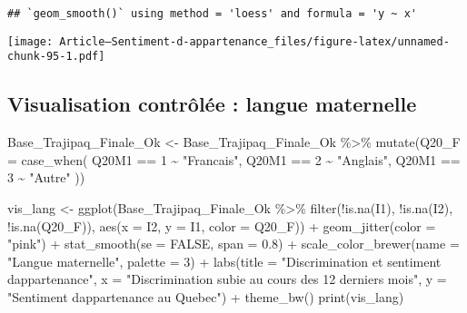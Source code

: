 \documentclass[
]{article}
\newenvironment{Shaded}{\begin{snugshade}}{\end{snugshade}}
\newcommand{\AttributeTok}[1]{\textcolor[rgb]{0.77,0.63,0.00}{#1}}
\newcommand{\ConstantTok}[1]{\textcolor[rgb]{0.00,0.00,0.00}{#1}}
\newcommand{\DecValTok}[1]{\textcolor[rgb]{0.00,0.00,0.81}{#1}}
\newcommand{\FloatTok}[1]{\textcolor[rgb]{0.00,0.00,0.81}{#1}}
\newcommand{\FunctionTok}[1]{\textcolor[rgb]{0.00,0.00,0.00}{#1}}
\newcommand{\NormalTok}[1]{#1}
\newcommand{\OtherTok}[1]{\textcolor[rgb]{0.56,0.35,0.01}{#1}}
\newcommand{\SpecialCharTok}[1]{\textcolor[rgb]{0.00,0.00,0.00}{#1}}
\newcommand{\StringTok}[1]{\textcolor[rgb]{0.31,0.60,0.02}{#1}}
\begin{document}
\begin{verbatim}
## `geom_smooth()` using method = 'loess' and formula = 'y ~ x'
\end{verbatim}

\texttt{[image: Article---Sentiment-d-appartenance\_files/figure-latex/unnamed-chunk-95-1.pdf]}

\hypertarget{visualisation-contruxf4luxe9e-langue-maternelle}{%
\subsection{Visualisation contrôlée : langue
maternelle}\label{visualisation-contruxf4luxe9e-langue-maternelle}}

\begin{Shaded}
\begin{Highlighting}[]
\NormalTok{Base\_Trajipaq\_Finale\_Ok }\OtherTok{\textless{}{-}}
\NormalTok{  Base\_Trajipaq\_Finale\_Ok }\SpecialCharTok{\%\textgreater{}\%}
  \FunctionTok{mutate}\NormalTok{(}\AttributeTok{Q20\_F =} \FunctionTok{case\_when}\NormalTok{(}
\NormalTok{    Q20M1 }\SpecialCharTok{==} \DecValTok{1} \SpecialCharTok{\textasciitilde{}} \StringTok{"Francais"}\NormalTok{,}
\NormalTok{    Q20M1 }\SpecialCharTok{==} \DecValTok{2} \SpecialCharTok{\textasciitilde{}} \StringTok{"Anglais"}\NormalTok{,}
\NormalTok{    Q20M1 }\SpecialCharTok{==} \DecValTok{3} \SpecialCharTok{\textasciitilde{}} \StringTok{"Autre"}
\NormalTok{  ))}
\end{Highlighting}
\end{Shaded}

\begin{Shaded}
\begin{Highlighting}[]
\NormalTok{vis\_lang }\OtherTok{\textless{}{-}} \FunctionTok{ggplot}\NormalTok{(Base\_Trajipaq\_Finale\_Ok }\SpecialCharTok{\%\textgreater{}\%}
                \FunctionTok{filter}\NormalTok{(}\SpecialCharTok{!}\FunctionTok{is.na}\NormalTok{(I1), }\SpecialCharTok{!}\FunctionTok{is.na}\NormalTok{(I2), }\SpecialCharTok{!}\FunctionTok{is.na}\NormalTok{(Q20\_F)), }\FunctionTok{aes}\NormalTok{(}\AttributeTok{x =}\NormalTok{ I2, }\AttributeTok{y =}\NormalTok{ I1, }\AttributeTok{color =}\NormalTok{ Q20\_F)) }\SpecialCharTok{+}
  \FunctionTok{geom\_jitter}\NormalTok{(}\AttributeTok{color =} \StringTok{"pink"}\NormalTok{) }\SpecialCharTok{+}
  \FunctionTok{stat\_smooth}\NormalTok{(}\AttributeTok{se =} \ConstantTok{FALSE}\NormalTok{, }\AttributeTok{span =} \FloatTok{0.8}\NormalTok{) }\SpecialCharTok{+}
  \FunctionTok{scale\_color\_brewer}\NormalTok{(}\AttributeTok{name =} \StringTok{"Langue maternelle"}\NormalTok{, }\AttributeTok{palette =} \DecValTok{3}\NormalTok{) }\SpecialCharTok{+}
  \FunctionTok{labs}\NormalTok{(}\AttributeTok{title =} \StringTok{"Discrimination et sentiment d\textquotesingle{}appartenance"}\NormalTok{, }
       \AttributeTok{x =} \StringTok{"Discrimination subie au cours des 12 derniers mois"}\NormalTok{, }
       \AttributeTok{y =} \StringTok{"Sentiment d\textquotesingle{}appartenance au Quebec"}\NormalTok{) }\SpecialCharTok{+}
  \FunctionTok{theme\_bw}\NormalTok{()}
\FunctionTok{print}\NormalTok{(vis\_lang)}
\end{Highlighting}
\end{Shaded}
\end{document}
